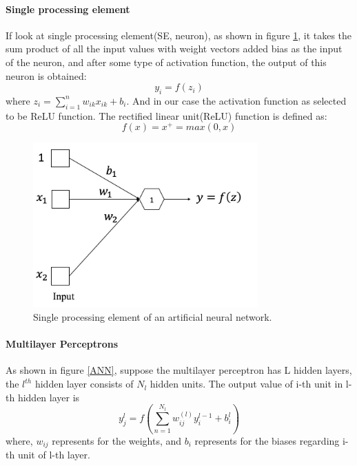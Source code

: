 \documentclass[conference]{IEEEtran}
\begin{document}
\paragraph {Single processing element}
If look at single processing element(SE, neuron), as shown in figure \ref{PE}, it takes the sum product of all the input values with weight vectors added bias as the input of the neuron, and after some type of activation function, the output of this neuron is obtained:
$$y_i = f(z_i)$$
where $z_i = \sum_{i=1}^n w_{ik}x_{ik}+b_{i}$. And in our case the activation function as selected to be ReLU function. The rectified linear unit(ReLU) function is defined as:
$$f(x) = x^{+} = max(0,x)$$
\begin{figure}[h!]
\centerline{\includegraphics[width=3.4in]{sPE.jpg}}
\caption{Single processing element of an artificial neural network.}
\label{PE}
\end{figure}
\paragraph {Multilayer Perceptrons}
As shown in figure \ref{ANN}, suppose the multilayer perceptron has L hidden layers, the $l^{th}$ hidden layer consists of $N_{l}$ hidden units. The output value of i-th unit in l-th hidden layer is 
$$y_{j}^l = f(\sum_{n=1}^{N_l}w_{ij}^{(l)}y_i^{l-1}+b_i^{l})$$
where, $w_{ij}$ represents for the weights, and $b_{i}$ represents for the biases regarding i-th unit of l-th layer. 
\end{document}
